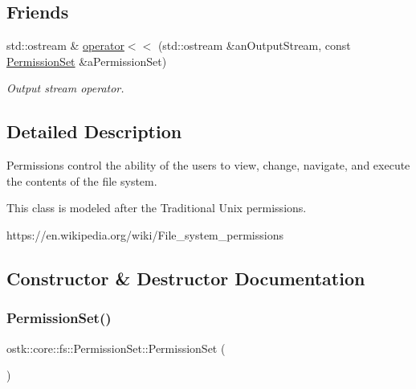 \subsection*{Friends}
\begin{DoxyCompactItemize}
\item 
std\+::ostream \& \hyperlink{classostk_1_1core_1_1fs_1_1_permission_set_a8f2d68bb94d86dea76869abe148ea9f3}{operator$<$$<$} (std\+::ostream \&an\+Output\+Stream, const \hyperlink{classostk_1_1core_1_1fs_1_1_permission_set}{Permission\+Set} \&a\+Permission\+Set)
\begin{DoxyCompactList}\small\item\em Output stream operator. \end{DoxyCompactList}\end{DoxyCompactItemize}


\subsection{Detailed Description}
Permissions control the ability of the users to view, change, navigate, and execute the contents of the file system. 

This class is modeled after the Traditional Unix permissions.

https\+://en.wikipedia.\+org/wiki/\+File\+\_\+system\+\_\+permissions 

\subsection{Constructor \& Destructor Documentation}
\mbox{\label{classostk_1_1core_1_1fs_1_1_permission_set_a31c918014e874ceac487e92d0d3ac5a2}} 
\subsubsection{\texorpdfstring{Permission\+Set()}{PermissionSet()}\hspace{0.1cm}{\footnotesize\ttfamily [1/2]}}
{\footnotesize\ttfamily ostk\+::core\+::fs\+::\+Permission\+Set\+::\+Permission\+Set (\begin{DoxyParamCaption}{ }\end{DoxyParamCaption})\hspace{0.3cm}{\ttfamily [delete]}}



